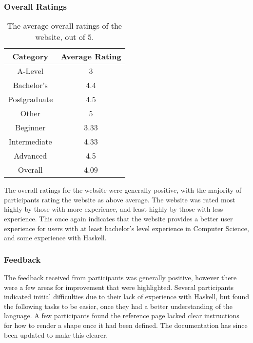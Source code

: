 \documentclass[../main.tex]{subfiles}
\begin{document}
            \subsubsection{Overall Ratings}
                \begin{table}[H]
                    \centering
                    \begin{tabular}{c|c}
                        \textbf{Category} & \textbf{Average Rating} \\
                        \hline
                        A-Level           & 3                       \\
                        Bachelor's        & 4.4                     \\
                        Postgraduate      & 4.5                     \\
                        Other             & 5                       \\
                        \hline
                        Beginner          & 3.33                    \\
                        Intermediate      & 4.33                    \\
                        Advanced          & 4.5                     \\
                        \hline
                        Overall           & 4.09                    \\
                    \end{tabular}
                    \caption{The average overall ratings of the website, out of 5.}
                \end{table}

                The overall ratings for the website were generally positive, with the majority
                    of participants rating the website as above average.
                The website was rated most highly by those with more experience, and least
                    highly by those with less experience.
                This once again indicates that the website provides a better user experience
                    for users with at least bachelor's level experience in Computer Science, and
                    some experience with Haskell.

            \subsubsection{Feedback}
                The feedback received from participants was generally positive, however there
                    were a few areas for improvement that were highlighted.
                Several participants indicated initial difficulties due to their lack of
                    experience with Haskell, but found the following tasks to be easier, once they
                    had a better understanding of the language.
                A few participants found the reference page lacked clear instructions for how
                    to render a shape once it had been defined.
                The documentation has since been updated to make this clearer.
\end{document}
